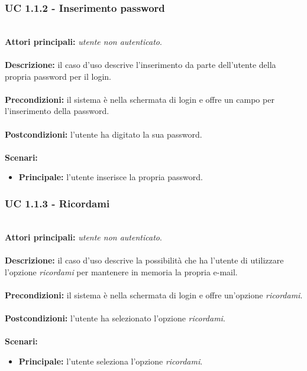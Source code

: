\documentclass[a4paper,11pt]{article}
\begin{document}
\vspace{6 mm}

\subsubsection{UC 1.1.2 - Inserimento password}
\ \\
\textbf{Attori principali:} \textit{utente non autenticato}.\\
\\
\textbf{Descrizione:} il caso d'uso descrive l'inserimento da parte dell'utente della propria password per il login. \\
\\
\textbf{Precondizioni:} il sistema è nella schermata di login e offre un campo per l'inserimento della password.\\
\\
\textbf{Postcondizioni:} l'utente ha digitato la sua password. \\
\\
\textbf{Scenari:}
\begin{itemize}
\item \textbf{Principale:} l'utente inserisce la propria password.
\end{itemize}

\vspace{6 mm}

\subsubsection{UC 1.1.3 - Ricordami}
\ \\
\textbf{Attori principali:} \textit{utente non autenticato}.\\
\\
\textbf{Descrizione:} il caso d'uso descrive la possibilità che ha l'utente di utilizzare l'opzione \textit{ricordami} per mantenere in memoria la propria e-mail. \\
\\
\textbf{Precondizioni:} il sistema è nella schermata di login e offre un'opzione \textit{ricordami}.\\
\\
\textbf{Postcondizioni:} l'utente ha selezionato l'opzione \textit{ricordami}. \\
\\
\textbf{Scenari:}
\begin{itemize}
\item \textbf{Principale:} l'utente seleziona l'opzione \textit{ricordami}.
\end{itemize}
\end{document}
